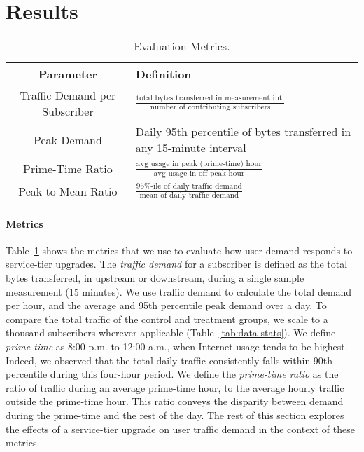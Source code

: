\section{Results}\label{sec:analysis}

\begin{table}[t]
\centering
\begin{small}
\begin{tabular}{| c | p{2in} |}\hline
\textbf{Parameter} & \textbf{Definition}	\\\hline
Traffic Demand per Subscriber& \(\frac{\text{total bytes transferred in 
measurement int.}}{\text{number of contributing subscribers}}\)	\\
Peak Demand & Daily 95th percentile of bytes transferred in any 
15-minute interval \\ 
Prime-Time Ratio 	& \( \frac{ \text{avg usage in peak (prime-time) 
hour}}{ \text{avg usage in off-peak hour}}\) 		\\
Peak-to-Mean Ratio 		& \(\frac{\text{95\%-ile of daily traffic 
demand}}{\text{mean of daily traffic demand}}\)	\\\hline
\end{tabular}
\end{small}
\caption{Evaluation Metrics.}
\label{tab:eval-criteria}
\end{table}

\paragraph{Metrics}
Table~\ref{tab:eval-criteria} shows the metrics that we use to evaluate
how user demand responds to service-tier upgrades. The \emph{traffic
  demand} for a subscriber is defined as the total bytes transferred, in
upstream or downstream, during a single sample measurement (15 minutes).
We use traffic demand to calculate the total demand per hour, and the
average and 95th percentile peak demand over a day. To compare the total
traffic of the control and treatment groups, we scale to a thousand
subscribers wherever applicable (Table~\ref{tab:data-stats}).  We
define \emph{prime time} as 8:00 p.m. to 12:00 a.m., when Internet usage
tends to be highest.  Indeed, we
observed that the total daily traffic consistently falls within 90th percentile
during this four-hour period. We define the \emph{prime-time ratio} as
the ratio of traffic during an average prime-time hour, to the average
hourly traffic outside the prime-time hour.  This ratio conveys the
disparity between demand during the prime-time and the rest of the day.
The rest of this section explores the effects of a service-tier upgrade
on user traffic demand in the context of these metrics.









%